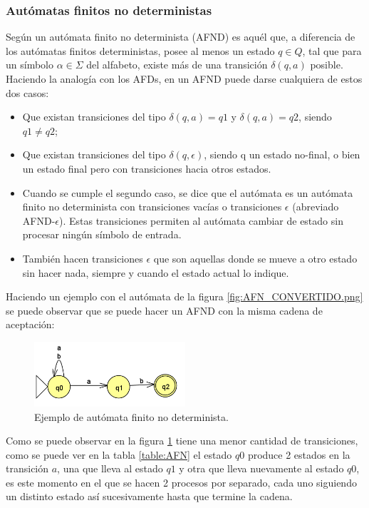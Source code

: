\subsubsection {Autómatas finitos no deterministas}      
Según \cite{[PINOCHO3]} un autómata finito no determinista (AFND) es aquél que, a diferencia de los autómatas finitos deterministas, posee al menos un estado $ q \in Q$, tal que para un símbolo $\alpha \in \Sigma$ del alfabeto, existe más de una transición $\delta(q,a)$ posible. Haciendo la analogía con los AFDs, en un AFND puede darse cualquiera de estos dos casos:
    \begin{itemize}
        \item Que existan transiciones del tipo $\delta(q,a)=q1$ y $\delta(q,a)=q2$, siendo $q1 \neq q2$;
        \item Que existan transiciones del tipo $\delta(q,\epsilon)$, siendo q un estado no-final, o bien un estado final pero con transiciones hacia otros estados.
        \item Cuando se cumple el segundo caso, se dice que el autómata es un autómata finito no determinista con transiciones vacías o transiciones $\epsilon$ (abreviado AFND-$\epsilon$). Estas transiciones permiten al autómata cambiar de estado sin procesar ningún símbolo de entrada.
        \item También hacen transiciones $\epsilon$ que son aquellas donde se mueve a otro estado sin hacer nada, siempre y cuando el estado actual lo indique.
    \end{itemize}
\hspace*{1cm}Haciendo un ejemplo con el autómata de la figura \ref{fig:AFN_CONVERTIDO.png} se puede observar que se puede hacer un AFND con la misma cadena de aceptación:

    \begin{figure}[hbtp]
        \centering
            \includegraphics[width=0.5\textwidth]{MarcoTeorico/Imagenes/AFN.png}
            \caption{Ejemplo de autómata finito no determinista.}     
            \label{fig:AFN.png}
    \end{figure} 
    
\hspace*{1cm}Como se puede observar en la figura \ref{fig:AFN.png} tiene una menor cantidad de transiciones, como se puede ver en la tabla \ref{table:AFN} el estado $q0$ produce 2 estados en la transición $a$, una que lleva al estado $q1$ y otra que lleva nuevamente al estado $q0$, es este momento en el que se hacen 2 procesos por separado, cada uno siguiendo un distinto estado así sucesivamente hasta que termine la cadena.

